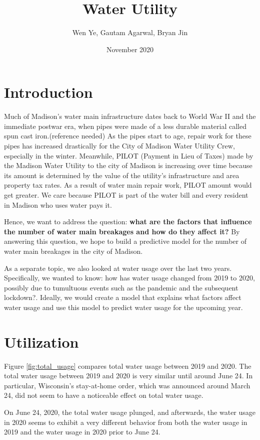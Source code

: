 \documentclass[twocolumn]{article}
\title{Water Utility}
\author{Wen Ye, Gautam Agarwal, Bryan Jin}
\date{November 2020}
\begin{document}
\maketitle

\section{Introduction}


 Much of Madison's water main infrastructure dates back to World War II and the immediate postwar era, when pipes were made of a less durable material called spun cast iron.(reference needed) As the pipes start to age, repair work for these pipes has increased drastically for the City of Madison Water Utility Crew, especially in the winter. Meanwhile, PILOT (Payment in Lieu of Taxes) made by the Madison Water Utility to the city of Madison is increasing over time because its amount is determined by the value of the utility's infrastructure and area property tax rates. As a result of water main repair work, PILOT amount would get greater. We care because PILOT is part of the water bill and every resident in Madison who uses water pays it. 
 
 Hence, we want to address the question: \textbf{what are the factors that influence the number of water main breakages and how do they affect it?} By answering this question, we hope to build a predictive model for the number of water main breakages in the city of Madison. 

As a separate topic, we also looked at water usage over the last two years. Specifically, we wanted to know: how has water usage changed from 2019 to 2020, possibly due to tumultuous events such as the pandemic and the subsequent lockdown?. Ideally, we would create a model that explains what factors affect water usage and use this model to predict water usage for the upcoming year.

\section{Utilization}

Figure \ref{fig:total_usage} compares total water usage between 2019 and 2020. The total water usage between 2019 and 2020 is very similar until around June 24. In particular, Wisconsin's stay-at-home order, which was announced around March 24, did not seem to have a noticeable effect on total water usage. 

On June 24, 2020, the total water usage plunged, and afterwards, the water usage in 2020 seems to exhibit a very different behavior from both the water usage in 2019 and the water usage in 2020 prior to June 24.
\end{document}
